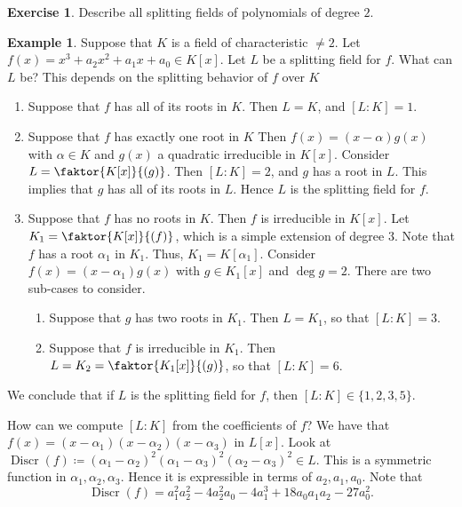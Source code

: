 \documentclass[10pt,letterpaper,cm]{nupset}
\theoremstyle{definition}
\newtheorem{exmp}[definition]{Example}
\theoremstyle{theorem}
\newtheorem{exercise}[definition]{Exercise}
\theoremstyle{remark}
\newcommand{\1}{\mathbf{1}}
\newcommand{\0}{\vec 0}
\DeclareMathOperator{\disc}{Discr}
\begin{document}
\begin{exercise}
Describe all splitting fields of polynomials of degree $2$.
\end{exercise}

\begin{exmp} 
Suppose that $K$ is a field of characteristic $\ne 2$. Let $f(x) = x^3 + a_2x^2 + a_1x + a_0 \in K[x]$. Let $L$ be a splitting field for $f$. What can $L$ be? This depends on the splitting behavior of $f$ over $K$
\begin{enumerate}[label=(\Alph*)]
\item Suppose that $f$ has all of its roots in $K$. Then $L = K$, and $[L:K]=1$.
\item Suppose that $f$ has exactly one root in $K$ Then $f(x) = \left(x-\alpha\right)g(x)$ with $\alpha \in K$ and $g(x)$ a quadratic irreducible in $K[x]$. Consider $L = \faktor{K[x]}{(g)}$. Then $[L: K]=2$, and $g$ has a root in $L$. This implies that $g$ has all of its roots in $L$. Hence $L$ is the splitting field for $f$. 
\item Suppose that $f$ has no roots in $K$. Then $f$ is irreducible in $K[x]$. Let $K_1 = \faktor{K[x]}{(f)}$, which is a simple extension of degree $3$. Note that $f$ has a root $\alpha_1$ in $K_1$. Thus, $K_1 = K[\alpha_1]$. Consider $f(x) = \left(x -\alpha_1\right)g(x)$ with $g \in K_1[x]$ and $\deg{g} =2$. There are two sub-cases to consider.
\begin{enumerate}
\item Suppose that $g$ has two roots in $K_1$. Then $L= K_1$, so that $[L:K] =3$.
\item Suppose that $f$ is irreducible in $K_1$. Then $L= K_2 = \faktor{K_1[x]}{(g)}$, so that $[L:K] =6$.
\end{enumerate}
\end{enumerate}
We conclude that if $L$ is the splitting field for $f$, then $[L:K] \in \{1, 2, 3, 5\}$.

\medskip


How can we compute $[L:K]$ from the coefficients of $f$?
We have that $f(x) = \left(x- \alpha_1\right)\left(x-\alpha_2\right)\left(x-\alpha_3\right)$ in $L[x]$. Look at $\disc(f)\coloneqq  (\alpha_1 - \alpha_2)^2(\alpha_1 - \alpha_3)^2(\alpha_2 - \alpha_3)^2 \in L$. This is a symmetric function in $\alpha_1, \alpha_2, \alpha_3$. Hence it is expressible in terms of $a_2, a_1, a_0$. Note that $$\disc(f) = a_1^2a_2^2 -4a_2^2a_0 -4a_1^3 + 18 a_0a_1a_2 - 27a_0^2.$$


\end{exmp}
\end{document}
